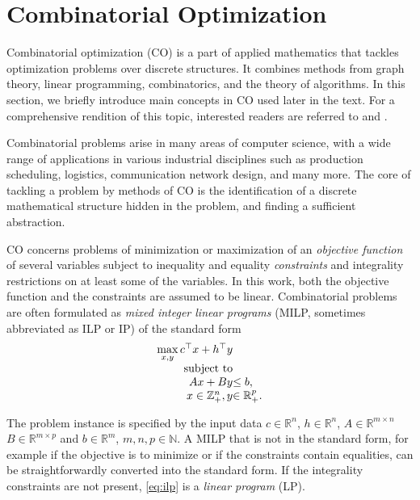 \section{Combinatorial Optimization}

Combinatorial optimization (CO) is a part of applied mathematics that tackles optimization problems over discrete structures.
It combines methods from graph theory, linear programming, combinatorics, and the theory of algorithms.
In this section, we briefly introduce main concepts in CO used later in the text.
For a comprehensive rendition of this topic, interested readers are referred to \cite{wolsey98} and \cite{nemhauser88}.

Combinatorial problems arise in many areas of computer science, with a wide range of applications in various industrial disciplines 
such as production scheduling, logistics, communication network design, and many more.
The core of tackling a problem by methods of CO is the identification of a discrete mathematical structure hidden in the problem,
and finding a sufficient abstraction.

CO concerns problems of minimization or maximization of an \emph{objective function} of several variables 
subject to inequality and equality \emph{constraints} and integrality restrictions on at least some of the variables.
In this work, both the objective function and the constraints are assumed to be linear.
Combinatorial problems are often formulated as \emph{mixed integer linear programs} (MILP, sometimes abbreviated as ILP or IP) of the standard form
\begin{equation}
\begin{array}{r@{}l}
	\max\limits_{x,y}c^\top x + h^\top y & \\
	\text{subject to}& \\
	  Ax + By &\leq b, \\
	  x \in \mathbb{Z}^{n}_+, y & \in\mathbb{R}^{p}_+. 
\end{array}
	\label{eq:ilp}
\end{equation}

The problem instance is specified by the input data $c\in \mathbb{R}^n$, $h \in \mathbb{R}^n$, 
$A \in \mathbb{R}^{m\times n}$  $B \in\mathbb{R}^{m\times p}$ and $b \in \mathbb{R}^m$, $m,n,p\in \mathbb{N}$.
A MILP that is not in the standard form, for example if the objective is to minimize or if the constraints contain equalities, can be straightforwardly converted into the standard form.
If the integrality constraints are not present, \eqref{eq:ilp} is a \emph{linear program} (LP).


